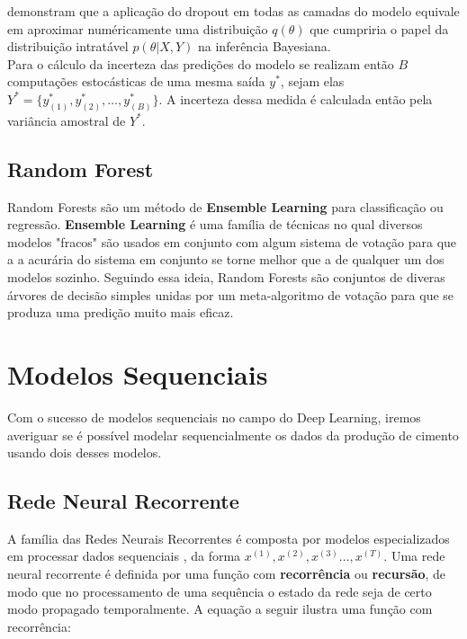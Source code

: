 \cite{dropbayes} demonstram que a aplicação do dropout em todas as camadas do
modelo equivale em aproximar numéricamente uma distribuição $q(\theta)$ que
cumpriria o papel da distribuição intratável $p(\theta | X,Y)$ na inferência Bayesiana. \\

Para o cálculo da incerteza das predições do modelo se realizam então $B$ computações estocásticas de uma mesma
saída $y^*$, sejam elas $Y^* = \{y^*_{(1)},y^*_{(2)}, \dots , y^*_{(B)}\}$. A incerteza
  dessa medida é calculada então pela variância amostral de $Y^*$.



\subsection{Random Forest}

Random Forests são um método de \textbf{Ensemble Learning} para classificação ou regressão. \textbf{Ensemble Learning} é uma família de técnicas no qual diversos modelos "fracos" são usados em conjunto com algum sistema de votação para que a a acurária do sistema em conjunto se torne melhor que a de qualquer um dos modelos sozinho. Seguindo essa ideia, Random Forests são conjuntos de diveras árvores de decisão simples unidas por um meta-algoritmo de votação para que se produza uma predição muito mais eficaz.


\section{Modelos Sequenciais}
Com o sucesso de modelos sequenciais no campo do Deep Learning, iremos averiguar se é possível modelar sequencialmente os dados da produção de cimento usando dois desses modelos. 
\\

\subsection{Rede Neural Recorrente}
% 

A família das Redes Neurais Recorrentes é composta por modelos especializados
em processar dados sequenciais \citep{dlbook}, da forma $x^{(1)},x^{(2)} ,x^{(3)}\dots ,x^{(T)}$. Uma rede neural recorrente é definida por uma função com
\textbf{recorrência} ou \textbf{recursão}, de modo que no processamento de uma
sequência o estado da rede seja de certo modo propagado temporalmente. A equação
a seguir ilustra uma função com recorrência: \\

